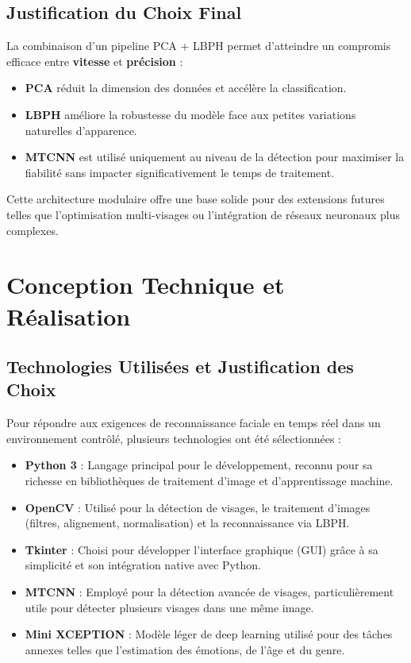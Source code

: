 \documentclass[a4paper,12pt]{report} %
\begin{document}
\section*{Justification du Choix Final}
La combinaison d'un pipeline PCA + LBPH permet d'atteindre un compromis efficace entre \textbf{vitesse} et \textbf{précision} :
\begin{itemize}
    \item \textbf{PCA} réduit la dimension des données et accélère la classification.
    \item \textbf{LBPH} améliore la robustesse du modèle face aux petites variations naturelles d'apparence.
    \item \textbf{MTCNN} est utilisé uniquement au niveau de la détection pour maximiser la fiabilité sans impacter significativement le temps de traitement.
\end{itemize}

Cette architecture modulaire offre une base solide pour des extensions futures telles que l'optimisation multi-visages ou l'intégration de réseaux neuronaux plus complexes.

\chapter{Conception Technique et Réalisation}

\section{Technologies Utilisées et Justification des Choix}
Pour répondre aux exigences de reconnaissance faciale en temps réel dans un environnement contrôlé, plusieurs technologies ont été sélectionnées :

\begin{itemize}
    \item \textbf{Python 3} : Langage principal pour le développement, reconnu pour sa richesse en bibliothèques de traitement d'image et d'apprentissage machine.
    \item \textbf{OpenCV} : Utilisé pour la détection de visages, le traitement d'images (filtres, alignement, normalisation) et la reconnaissance via LBPH.
    \item \textbf{Tkinter} : Choisi pour développer l'interface graphique (GUI) grâce à sa simplicité et son intégration native avec Python.
    \item \textbf{MTCNN} : Employé pour la détection avancée de visages, particulièrement utile pour détecter plusieurs visages dans une même image.
    \item \textbf{Mini XCEPTION} : Modèle léger de deep learning utilisé pour des tâches annexes telles que l'estimation des émotions, de l'âge et du genre.
\end{itemize}
\end{document}
